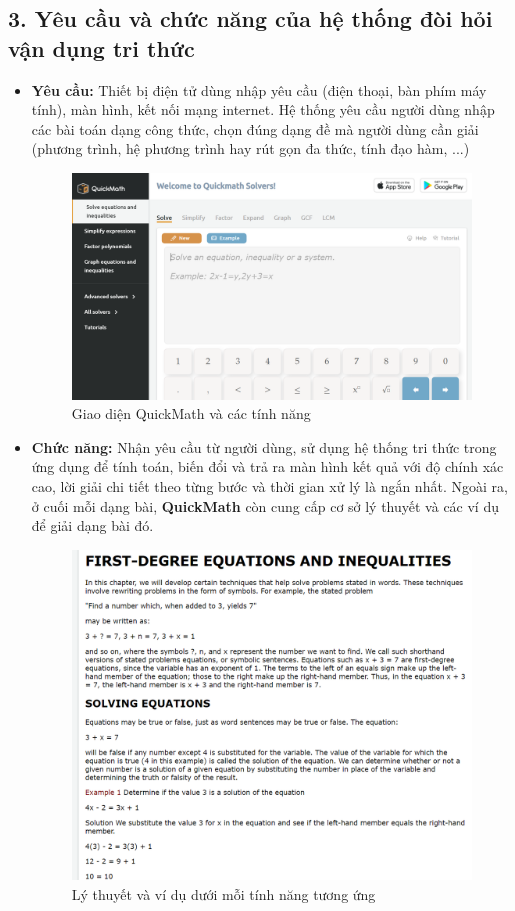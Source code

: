 \documentclass[a4paper]{article}
\begin{document}
\subsection*{3. Yêu cầu và chức năng của hệ thống đòi hỏi vận dụng tri thức}
\begin{itemize}
	\item \textbf{Yêu cầu: }Thiết bị điện tử dùng nhập yêu cầu (điện thoại, bàn phím máy tính), màn hình, kết nối mạng internet. Hệ thống yêu cầu người dùng nhập các bài toán dạng công thức, chọn đúng dạng đề mà người dùng cần giải (phương trình, hệ phương trình hay rút gọn đa thức, tính đạo hàm, ...)
	\begin{figure}
		\centering
		\includegraphics[width=0.7\linewidth]{quickmath1}
		\caption{Giao diện QuickMath và các tính năng}
		\label{fig:quickmath1}
	\end{figure}
	\item \textbf{Chức năng: } Nhận yêu cầu từ người dùng, sử dụng hệ thống tri thức trong ứng dụng để tính toán, biến đổi và trả ra màn hình kết quả với độ chính xác cao, lời giải chi tiết theo từng bước và thời gian xử lý là ngắn nhất. Ngoài ra, ở cuối mỗi dạng bài, \textbf{QuickMath} còn cung cấp cơ sở lý thuyết và các ví dụ để giải dạng bài đó.
	\begin{figure}
		\centering
		\includegraphics[width=0.7\linewidth]{quickmath3}
		\caption{Lý thuyết và ví dụ dưới mỗi tính năng tương ứng}
		\label{fig:quickmath3}
	\end{figure}
\end{itemize}
\end{document}
